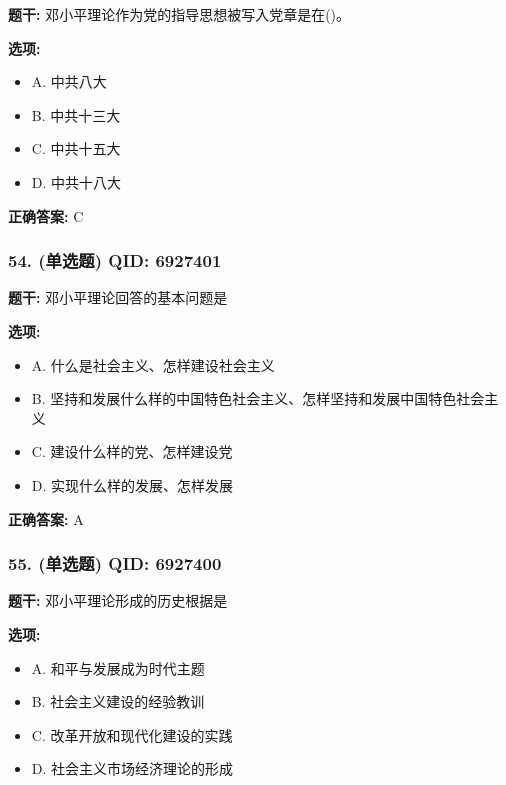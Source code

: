 \documentclass[12pt,UTF8]{ctexart}
\begin{document}
\textbf{题干:}
邓小平理论作为党的指导思想被写入党章是在()。

\textbf{选项:}
\begin{itemize}[leftmargin=*]

  \item A. 中共八大

  \item B. 中共十三大

  \item C. 中共十五大

  \item D. 中共十八大

\end{itemize}

\textbf{正确答案:}
C

\vspace{0.3em}\hrulefill\vspace{0.7em}

\subsubsection*{54. (单选题) \small QID: 6927401}

\textbf{题干:}
邓小平理论回答的基本问题是

\textbf{选项:}
\begin{itemize}[leftmargin=*]

  \item A. 什么是社会主义、怎样建设社会主义

  \item B. 坚持和发展什么样的中国特色社会主义、怎样坚持和发展中国特色社会主义

  \item C. 建设什么样的党、怎样建设党

  \item D. 实现什么样的发展、怎样发展

\end{itemize}

\textbf{正确答案:}
A

\vspace{0.3em}\hrulefill\vspace{0.7em}

\subsubsection*{55. (单选题) \small QID: 6927400}

\textbf{题干:}
邓小平理论形成的历史根据是

\textbf{选项:}
\begin{itemize}[leftmargin=*]

  \item A. 和平与发展成为时代主题

  \item B. 社会主义建设的经验教训

  \item C. 改革开放和现代化建设的实践

  \item D. 社会主义市场经济理论的形成

\end{itemize}
\end{document}
